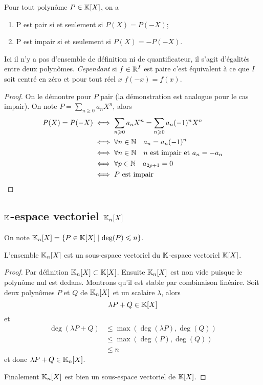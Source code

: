\begin{prop}
  Pour tout polynôme $P \in \mathbb{K}[X]$, on a
  \begin{enumerate}
  \item P est pair si et seulement si $P(X)=P(-X)$;
  \item P est impair si et seulement si $P(X)=-P(-X)$.
  \end{enumerate}
\end{prop}

\danger Ici il n'y a pas d'ensemble de définition ni de quantificateur, il s'agit d'égalités entre deux polynômes. \emph{Cependant} si $f \in \mathbb{R}^I$ est paire c'est équivalent à ce que $I$ soit centré en zéro et pour tout réel $x$ $f(-x)=f(x)$.

\begin{proof}
  On le démontre pour $P$ pair (la démonstration est analogue pour le cas impair). On note $P = \sum_{n\geqslant 0} a_n X^n$, alors
  \begin{align}
    P(X) = P(-X) &\iff \sum_{n \geqslant 0} a_n X^n = \sum_{n \geqslant 0} a_n (-1)^n X^n\\
    &\iff \forall n \in \mathbb{N} \quad a_n=a_n(-1)^n\\
    &\iff \forall n \in \mathbb{N} \quad n \text{~est impair et~} a_n=-a_n\\
    &\iff \forall p \in \mathbb{N} \quad a_{2p+1}=0\\
    &\iff P \text{~est impair}
  \end{align}
\end{proof}

\subsection{$\mathbb{K}$-espace vectoriel $\mathbb{K}_n[X]$}

On note $\mathbb{K}_n[X]=\left\{P \in \mathbb{K}[X]\mathrel{}\middle|\mathrel{}\deg(P) \leqslant n\right\}$.

\begin{prop}
  L'ensemble $\mathbb{K}_n[X]$ est un sous-espace vectoriel du $\mathbb{K}$-espace vectoriel $\mathbb{K}[X]$.
\end{prop}
\begin{proof}
  Par définition $\mathbb{K}_n[X] \subset \mathbb{K}[X]$. Ensuite $\mathbb{K}_n[X]$ est non vide puisque le polynôme nul est dedans. Montrons qu'il est stable par combinaison linéaire. Soit deux polynômes $P$ et $Q$ de $\mathbb{K}_n[X]$ et un scalaire $\lambda$, alors
  \begin{equation}
    \lambda P +Q \in \mathbb{K}[X]
  \end{equation}
  et
  \begin{align}
    \deg(\lambda P+Q) &\leqslant \max(\deg(\lambda P),\deg(Q))\\
    &\leqslant \max(\deg(P),\deg(Q))\\
    &\leqslant n
  \end{align}
  et donc $\lambda P +Q \in \mathbb{K}_n[X]$.

  Finalement $\mathbb{K}_n[X]$ est bien un sous-espace vectoriel de $\mathbb{K}[X]$. 
\end{proof}

